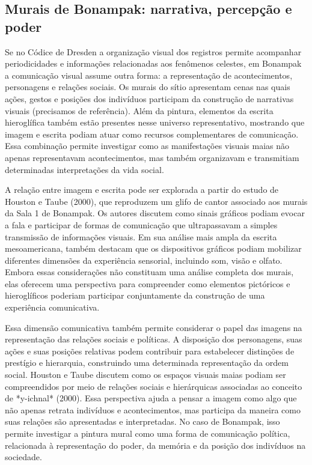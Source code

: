 \documentclass[11pt, a4paper]{article}
\begin{document}
\subsection{ Murais de Bonampak: narrativa, percepção e poder}


Se no Códice de Dresden a organização visual dos registros permite acompanhar periodicidades e informações relacionadas aos fenômenos celestes, em Bonampak a comunicação visual assume outra forma: a representação de acontecimentos, personagens e relações sociais. Os murais do sítio apresentam cenas nas quais ações, gestos e posições dos indivíduos participam da construção de narrativas visuais (precisamos de referência). Além da pintura, elementos da escrita hieroglífica também estão presentes nesse universo representativo, mostrando que imagem e escrita podiam atuar como recursos complementares de comunicação. Essa combinação permite investigar como as manifestações visuais maias não apenas representavam acontecimentos, mas também organizavam e transmitiam determinadas interpretações da vida social.

A relação entre imagem e escrita pode ser explorada a partir do estudo de Houston e Taube (2000), que reproduzem um glifo de cantor associado aos murais da Sala 1 de Bonampak. Os autores discutem como sinais gráficos podiam evocar a fala e participar de formas de comunicação que ultrapassavam a simples transmissão de informações visuais. Em sua análise mais ampla da escrita mesoamericana, também destacam que os dispositivos gráficos podiam mobilizar diferentes dimensões da experiência sensorial, incluindo som, visão e olfato. Embora essas considerações não constituam uma análise completa dos murais, elas oferecem uma perspectiva para compreender como elementos pictóricos e hieroglíficos poderiam participar conjuntamente da construção de uma experiência comunicativa.

Essa dimensão comunicativa também permite considerar o papel das imagens na representação das relações sociais e políticas. A disposição dos personagens, suas ações e suas posições relativas podem contribuir para estabelecer distinções de prestígio e hierarquia, construindo uma determinada representação da ordem social. Houston e Taube discutem como os espaços visuais maias podiam ser compreendidos por meio de relações sociais e hierárquicas associadas ao conceito de *y-ichnal* (2000). Essa perspectiva ajuda a pensar a imagem como algo que não apenas retrata indivíduos e acontecimentos, mas participa da maneira como suas relações são apresentadas e interpretadas. No caso de Bonampak, isso permite investigar a pintura mural como uma forma de comunicação política, relacionada à representação do poder, da memória e da posição dos indivíduos na sociedade.
\end{document}
